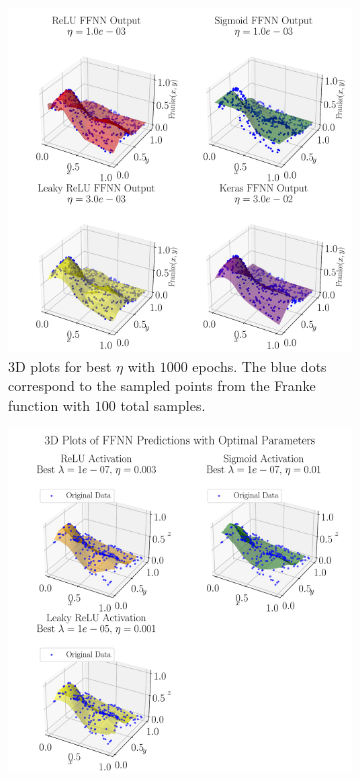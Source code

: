 \documentclass[%
reprint,s
amsmath,amssymb,
aps,
]{revtex4-2}
\begin{document}
\begin{figure}[ht!]
	\begin{subfigure}[b]{0.43\textwidth}
		\includegraphics[width=\textwidth]{Figures/NN_3D_Predict_Franke_Epochs1000.pdf}
		\caption{3D plots for best $\eta$ with $1000$ epochs. The blue dots correspond to the sampled points from the Franke function with $100$ total samples.}
		\label{fig:3D_Franke}
	\end{subfigure}
	\hfill
	\begin{subfigure}[b]{0.43\textwidth}
		\includegraphics[width=\textwidth]{Figures/NN_noKeras_3D_Franke_Epochs250.pdf}

\end{subfigure}
\end{figure}
\end{document}
